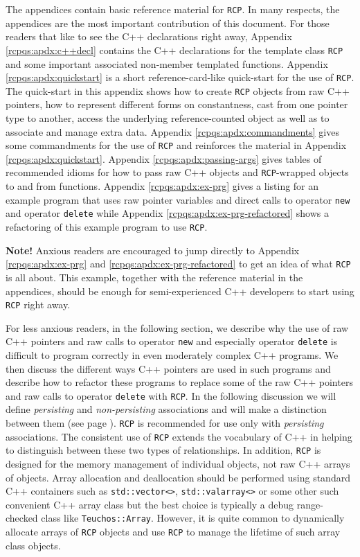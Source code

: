 \documentclass[pdf,ps2pdf,11pt]{SANDreport}
\begin{document}
The appendices contain basic reference material for {}\texttt{RCP}.  In many
respects, the appendices are the most important contribution of this document.
For those readers that like to see the C++ declarations right away, Appendix
{}\ref{rcpqs:apdx:c++decl} contains the C++ declarations for the template
class {}\texttt{RCP} and some important associated non-member templated
functions.  Appendix {}\ref{rcpqs:apdx:quickstart} is a short
reference-card-like quick-start for the use of {}\texttt{RCP}.  The
quick-start in this appendix shows how to create {}\texttt{RCP} objects from
raw C++ pointers, how to represent different forms on constantness, cast from
one pointer type to another, access the underlying reference-counted object as
well as to associate and manage extra data.  Appendix
{}\ref{rcpqs:apdx:commandments} gives some commandments for the use of
{}\texttt{RCP} and reinforces the material in Appendix
{}\ref{rcpqs:apdx:quickstart}.  Appendix {}\ref{rcpqs:apdx:passing-args} gives
tables of recommended idioms for how to pass raw C++ objects and
{}\texttt{RCP}-wrapped objects to and from functions.  Appendix
{}\ref{rcpqs:apdx:ex-prg} gives a listing for an example program that uses raw
pointer variables and direct calls to operator {}\texttt{new} and operator
{}\texttt{delete} while Appendix {}\ref{rcpqs:apdx:ex-prg-refactored} shows a
refactoring of this example program to use {}\texttt{RCP}.

{}\textbf{Note!}  Anxious readers are encouraged to jump directly to
Appendix {}\ref{rcpqs:apdx:ex-prg} and
{}\ref{rcpqs:apdx:ex-prg-refactored} to get an idea of what
{}\texttt{RCP} is all about.  This example, together
with the reference material in the appendices, should be enough for
semi-experienced C++ developers to start using
{}\texttt{RCP} right away.

For less anxious readers, in the following section, we describe why the use of
raw C++ pointers and raw calls to operator {}\texttt{new} and especially
operator {}\texttt{delete} is difficult to program correctly in even
moderately complex C++ programs.  We then discuss the different ways C++
pointers are used in such programs and describe how to refactor these programs
to replace some of the raw C++ pointers and raw calls to operator
{}\texttt{delete} with {}\texttt{RCP}.  In the following discussion we will
define {}\textit{persisting} and {}\textit{non-persisting} associations and
will make a distinction between them (see page
{}\pageref{rcp:non-persisting-defined}).  {}\texttt{RCP} is recommended for
use only with {}\textit{persisting} associations.  The consistent use of
{}\texttt{RCP} extends the vocabulary of C++ in helping to distinguish between
these two types of relationships.  In addition, {}\texttt{RCP} is designed for
the memory management of individual objects, not raw C++ arrays of objects.
Array allocation and deallocation should be performed using standard C++
containers such as {}\texttt{std\-::vector<>}, {}\texttt{std\-::valarray<>} or
some other such convenient C++ array class but the best choice is typically a
debug range-checked class like {}\texttt{Teuchos\-::Array}.  However, it is
quite common to dynamically allocate arrays of {}\texttt{RCP} objects and use
{}\texttt{RCP} to manage the lifetime of such array class objects.
\end{document}
